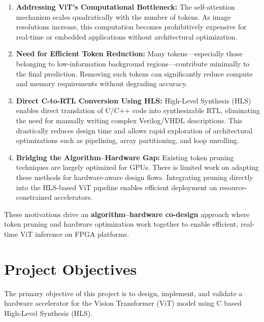 \begin{enumerate}

    \item \textbf{Addressing ViT’s Computational Bottleneck:}
    The self-attention mechanism scales quadratically with the number of tokens. As image resolutions increase, this computation becomes prohibitively expensive for real-time or embedded applications without architectural optimization.

    \item \textbf{Need for Efficient Token Reduction:}
    Many tokens—especially those belonging to low-information background regions—contribute minimally to the final prediction. Removing such tokens can significantly reduce compute and memory requirements without degrading accuracy.


    \item \textbf{Direct C-to-RTL Conversion Using HLS:}
    High-Level Synthesis (HLS) enables direct translation of C/C++ code into synthesizable RTL, eliminating the need for manually writing complex Verilog/VHDL descriptions. This drastically reduces design time and allows rapid exploration of architectural optimizations such as pipelining, array partitioning, and loop unrolling.

    \item \textbf{Bridging the Algorithm–Hardware Gap:}
    Existing token pruning techniques are largely optimized for GPUs. There is limited work on adapting these methods for hardware-aware design flows. Integrating pruning directly into the HLS-based ViT pipeline enables efficient deployment on resource-constrained accelerators.

\end{enumerate}

These motivations drive an \textbf{algorithm–hardware co-design} approach where token pruning and hardware optimization work together to enable efficient, real-time ViT inference on FPGA platforms.



\section{Project Objectives}

The primary objective of this project is to design, implement, and validate a hardware accelerator for the Vision Transformer (ViT) model using C based High-Level Synthesis (HLS).

